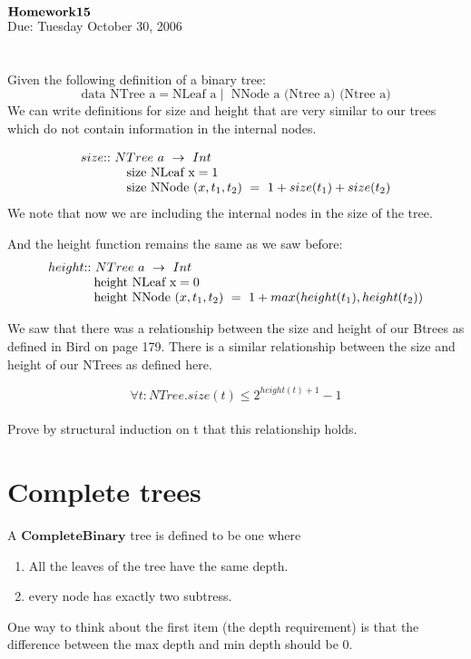 \documentclass[12pt]{article}
\begin{document}
 


${\bold{Homework 15}}$ \\
Due: Tuesday October 30, 2006 
\section{}
Given the following definition of a binary tree:
\[ \text{data NTree a} = \text{NLeaf a}\mid \text{ NNode a  (Ntree a) (Ntree a)}
\]
We can write definitions for size and height that are very similar to our trees
which do not contain information in the internal nodes.

\[ 
\begin{array}{l}
 size \text{::} \  NTree\  a\  \rightarrow \  Int \\
\hspace{.5in}\text{size NLeaf x} = 1 \\
\hspace{.5in}\text{size NNode }(x,t_1,t_2)\  =\  1 + size(t_1) + size(t_2) \\
\end{array}
\]
We note that now we are including the internal nodes in the size of the tree.


And the height function remains the same as we saw before:
\[ 
\begin{array}{l}
 height \text{::} \  NTree\  a\  \rightarrow \  Int \\
\hspace{.5in}\text{height NLeaf x} = 0 \\
\hspace{.5in}\text{height NNode }(x,t_1,t_2)\  =\  1 + max(height(t_1),height(t_2)) \\
\end{array}
\]

We saw that there was a relationship between the size and height of our Btrees
as defined in Bird on page 179. There is a similar relationship between
the size and height of our NTrees as defined here.  

\[  \forall t: NTree. size(t) \le 2^{height(t) + 1} - 1 \]
\\
Prove by structural induction on t that this relationship holds.

\section{Complete trees}
A $\mathbf{Complete Binary}$ tree is defined to be one where 
\begin{enumerate}
\item All the leaves of the tree have the same depth.
\item every node has exactly two subtress. 
\end{enumerate}
One way to think about the first item (the depth requirement) is that
the difference between the max depth and min depth should be 0.
\end{document}
